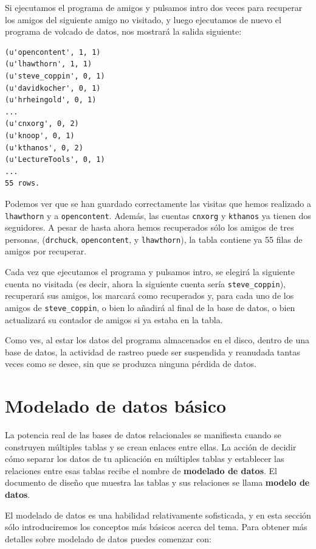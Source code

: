 Si ejecutamos el programa de amigos y pulsamos intro dos veces para recuperar
los amigos del siguiente amigo no visitado,
y luego ejecutamos de nuevo el programa de volcado de datos, nos mostrará la
salida siguiente: 

\beforeverb
\begin{verbatim}
(u'opencontent', 1, 1)
(u'lhawthorn', 1, 1)
(u'steve_coppin', 0, 1)
(u'davidkocher', 0, 1)
(u'hrheingold', 0, 1)
...
(u'cnxorg', 0, 2)
(u'knoop', 0, 1)
(u'kthanos', 0, 2)
(u'LectureTools', 0, 1)
...
55 rows.
\end{verbatim}
\afterverb
%
Podemos ver que se han guardado correctamente las visitas que hemos realizado
a {\tt lhawthorn} y a {\tt opencontent}. Además, las cuentas
{\tt cnxorg} y {\tt kthanos} ya tienen dos seguidores.
A pesar de hasta ahora hemos recuperados sólo los amigos de tres personas,
({\tt drchuck}, {\tt opencontent}, y {\tt lhawthorn}), la tabla contiene ya
55 filas de amigos por recuperar.

Cada vez que ejecutamos el programa y pulsamos intro, se elegirá la siguiente
cuenta no visitada (es decir, ahora la siguiente cuenta sería \verb"steve_coppin"),
recuperará sus amigos, los marcará como recuperados y, para cada uno de los
amigos de \verb"steve_coppin", o bien lo añadirá al final de la
base de datos, o bien actualizará su contador de amigos si ya estaba en la
tabla.

Como ves, al estar los datos del programa almacenados en el disco, dentro de una base de datos,
la actividad de rastreo puede ser suspendida y reanudada tantas veces como se desee,
sin que se produzca ninguna pérdida de datos.

\section{Modelado de datos básico}

La potencia real de las bases de datos relacionales se manifiesta cuando se construyen múltiples
tablas y se crean enlaces entre ellas. La acción de decidir cómo separar los datos de tu
aplicación en múltiples tablas y establecer las relaciones
entre esas tablas recibe el nombre de {\bf modelado de datos}. El
documento de diseño que muestra las tablas y sus relaciones
se llama {\bf modelo de datos}.

El modelado de datos es una habilidad relativamente sofisticada, y en esta sección sólo
introduciremos los conceptos más básicos acerca del tema. Para obtener más
detalles sobre modelado de datos puedes comenzar con:


